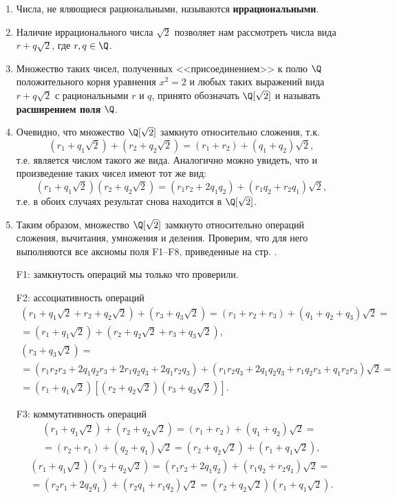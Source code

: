 \begin{enumerate}

\item Числа, не яляющиеся рациональными, называются \textbf{иррациональными}.
\item Наличие иррационального числа $\sqrt 2$ позволяет нам рассмотреть числа вида $r+q\sqrt 2$, где $r,q\in\Q$.
\item Множество таких чисел, полученных <<присоединением>> к полю $\Q$ положительного корня уравнения $x^2=2$ и любых таких выражений вида $r+q\sqrt 2$ с рациональными $r$ и $q$, принято обозначать $\Q[\sqrt 2]$ и называть \textbf{расширением поля} $\Q$.
\item Очевидно, что множество $\Q[\sqrt 2]$ замкнуто относительно сложения, т.к.
$$
(r_1+q_1\sqrt 2)+(r_2+q_2\sqrt 2)=(r_1+r_2)+(q_1+q_2)\sqrt 2,
$$
т.е. является числом такого же вида. Аналогично можно увидеть, что и произведение таких чисел имеют тот же вид:
$$
(r_1+q_1\sqrt 2)(r_2+q_2\sqrt 2)=(r_1r_2+2q_1q_2)+(r_1q_2+r_2q_1)\sqrt 2,
$$
т.е. в обоих случаях результат снова находится в $\Q[\sqrt 2]$.
\item Таким образом, множество $\Q[\sqrt 2]$ замкнуто относительно операций сложения, вычитания, умножения и деления. Проверим, что для него выполняются все аксиомы поля F1--F8, приведенные на стр. \pageref{FildAxiom}.

F1: замкнутость операций мы только что проверили.

F2: ассоциативность операций
\begin{multline*}
(r_1+q_1\sqrt 2 + r_2+q_2\sqrt 2)+(r_3+q_3\sqrt 2) = (r_1+r_2+r_3)+(q_1+q_2+q_3)\sqrt 2 = \\
=(r_1+q_1\sqrt 2) + (r_2+q_2\sqrt 2+r_3+q_3\sqrt 2),
\end{multline*}
\begin{multline*}
[(r_1+q_1\sqrt 2)(r_2+q_2\sqrt 2)](r_3+q_3\sqrt 2) = \\
=(r_1r_2r_3 + 2q_1q_2r_3 + 2r_1q_2q_3 + 2q_1r_2q_3) + (r_1r_2q_3 + 2q_1q_2q_3 + r_1q_2r_3 + q_1r_2r_3)\sqrt 2 = \\
=(r_1+q_1\sqrt 2)[(r_2+q_2\sqrt 2)(r_3+q_3\sqrt 2)].
\end{multline*}

F3: коммутативность операций
\begin{multline*}
(r_1+q_1\sqrt 2)+(r_2+q_2\sqrt 2) = (r_1+r_2)+(q_1+q_2)\sqrt 2 = \\
= (r_2+r_1)+(q_2+q_1)\sqrt 2 = (r_2+q_2\sqrt 2)+(r_1+q_1\sqrt 2),
\end{multline*}
\begin{multline*}
(r_1+q_1\sqrt 2)(r_2+q_2\sqrt 2) = (r_1r_2+2q_1q_2)+(r_1q_2+r_2q_1)\sqrt 2 = \\
=(r_2r_1+2q_2q_1)+(r_2q_1+r_1q_2)\sqrt 2 = (r_2+q_2\sqrt 2)(r_1+q_1\sqrt 2).
\end{multline*}


\end{enumerate}
